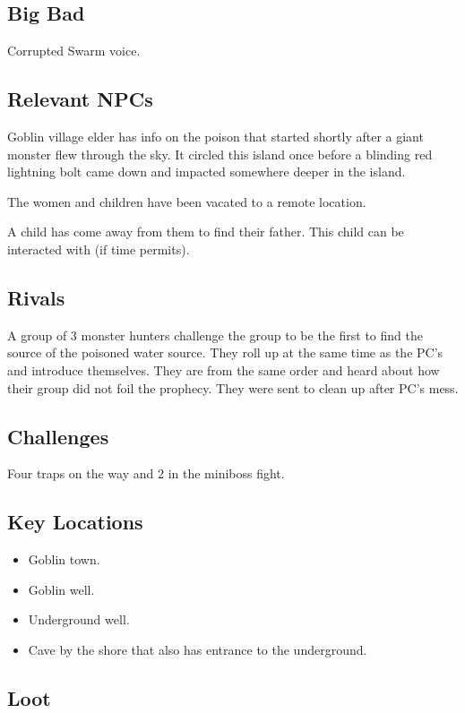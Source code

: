 \begin{multicols}{2}
  \subsection{Big Bad}
  Corrupted Swarm voice.

  \subsection{Relevant NPCs}
  Goblin village elder has info on the poison that started shortly after a giant monster flew through the sky. It circled this island once before a blinding red lightning bolt came down and impacted somewhere deeper in the island.

  The women and children have been vacated to a remote location.

  A child has come away from them to find their father. This child can be interacted with (if time permits).

  \subsection{Rivals}
  A group of 3 monster hunters challenge the group to be the first to find the source of the poisoned water source. They roll up at the same time as the PC's and introduce themselves. They are from the same order and heard about how their group did not foil the prophecy. They were sent to clean up after PC's mess.

  \subsection{Challenges}
  Four traps on the way and 2 in the miniboss fight.

  \subsection{Key Locations}
  \begin{itemize}
    \item Goblin town.
    \item Goblin well.
    \item Underground well.
    \item Cave by the shore that also has entrance to the underground.
  \end{itemize}

  \subsection{Loot}


\end{multicols}
